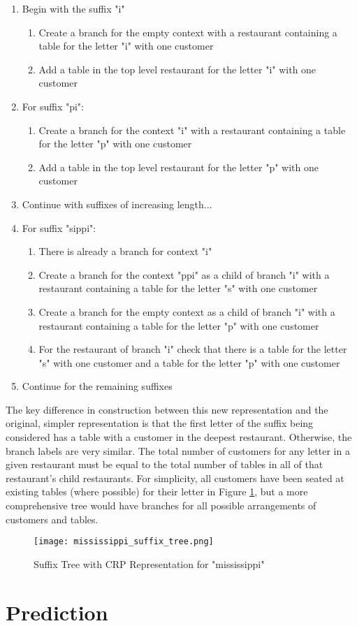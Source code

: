 \begin{enumerate}
\item Begin with the suffix "i"
\begin{enumerate}
\item Create a branch for the empty context with a restaurant containing a table for the letter "i" with one customer
\item Add a table in the top level restaurant for the letter "i" with one customer
\end{enumerate}
\item For suffix "pi":
\begin{enumerate}
\item Create a branch for the context "i" with a restaurant containing a table for the letter "p" with one customer
\item Add a table in the top level restaurant for the letter "p" with one customer
\end{enumerate}
\item Continue with suffixes of increasing length...
\item For suffix "sippi":
\begin{enumerate}
\item There is already a branch for context "i"
\item Create a branch for the context "ppi" as a child of branch "i" with a restaurant containing a table for the letter "s" with one customer
\item Create a branch for the empty context as a child of branch "i" with a restaurant containing a table for the letter "p" with one customer
\item For the restaurant of branch "i" check that there is a table for the letter "s" with one customer and a table for the letter "p" with one customer
\end{enumerate}
\item Continue for the remaining suffixes
\end{enumerate}

The key difference in construction between this new representation and the original, simpler representation is that the first letter of the suffix being considered has a table with a customer in the deepest restaurant. Otherwise, the branch labels are very similar. The total number of customers for any letter in a given restaurant must be equal to the total number of tables in all of that restaurant's child restaurants. For simplicity, all customers have been seated at existing tables (where possible) for their letter in Figure \ref{fig:mississippiSuffixTree}, but a more comprehensive tree would have branches for all possible arrangements of customers and tables.

\begin{figure}[h!]
  \centering
  \texttt{[image: mississippi\_suffix\_tree.png]}
  \caption{Suffix Tree with CRP Representation for "mississippi"}
  \label{fig:mississippiSuffixTree}
\end{figure}




\section{Prediction}